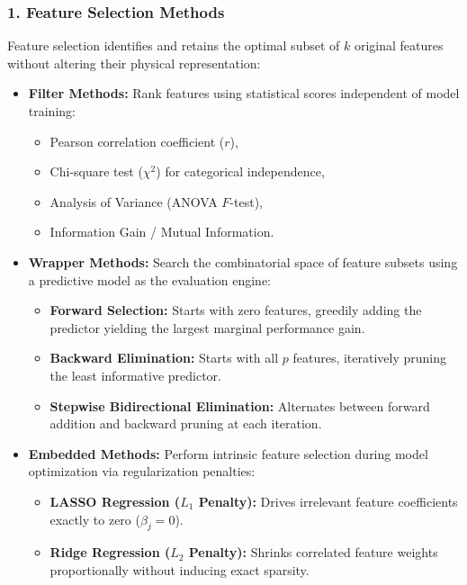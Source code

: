 \subsubsection{1. Feature Selection Methods}
Feature selection identifies and retains the optimal subset of $k$ original features without altering their physical representation:
\begin{itemize}
    \item \textbf{Filter Methods:} Rank features using statistical scores independent of model training:
    \begin{itemize}
        \item Pearson correlation coefficient ($r$),
        \item Chi-square test ($\chi^2$) for categorical independence,
        \item Analysis of Variance (ANOVA $F$-test),
        \item Information Gain / Mutual Information.
    \end{itemize}
    \item \textbf{Wrapper Methods:} Search the combinatorial space of feature subsets using a predictive model as the evaluation engine:
    \begin{itemize}
        \item \textbf{Forward Selection:} Starts with zero features, greedily adding the predictor yielding the largest marginal performance gain.
        \item \textbf{Backward Elimination:} Starts with all $p$ features, iteratively pruning the least informative predictor.
        \item \textbf{Stepwise Bidirectional Elimination:} Alternates between forward addition and backward pruning at each iteration.
    \end{itemize}
    \item \textbf{Embedded Methods:} Perform intrinsic feature selection during model optimization via regularization penalties:
    \begin{itemize}
        \item \textbf{LASSO Regression ($L_1$ Penalty):} Drives irrelevant feature coefficients exactly to zero ($\beta_j = 0$).
        \item \textbf{Ridge Regression ($L_2$ Penalty):} Shrinks correlated feature weights proportionally without inducing exact sparsity.
    \end{itemize}
\end{itemize}

